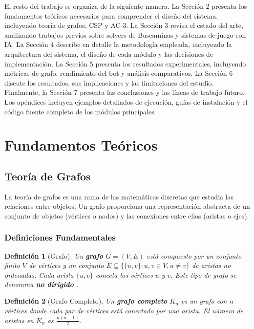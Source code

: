 \documentclass[12pt,a4paper]{article}
\newtheorem{definition}{Definición}[section]
\begin{document}
El resto del trabajo se organiza de la siguiente manera. La Sección 2 presenta los fundamentos teóricos necesarios para comprender el diseño del sistema, incluyendo teoría de grafos, CSP y AC-3. La Sección 3 revisa el estado del arte, analizando trabajos previos sobre solvers de Buscaminas y sistemas de juego con IA. La Sección 4 describe en detalle la metodología empleada, incluyendo la arquitectura del sistema, el diseño de cada módulo y las decisiones de implementación. La Sección 5 presenta los resultados experimentales, incluyendo métricas de grafo, rendimiento del bot y análisis comparativos. La Sección 6 discute los resultados, sus implicaciones y las limitaciones del estudio. Finalmente, la Sección 7 presenta las conclusiones y las líneas de trabajo futuro. Los apéndices incluyen ejemplos detallados de ejecución, guías de instalación y el código fuente completo de los módulos principales.

\section{Fundamentos Teóricos}

\subsection{Teoría de Grafos}

La teoría de grafos es una rama de las matemáticas discretas que estudia las relaciones entre objetos. Un grafo proporciona una representación abstracta de un conjunto de objetos (vértices o nodos) y las conexiones entre ellos (aristas o ejes).

\subsubsection{Definiciones Fundamentales}

\begin{definition}[Grafo]
Un \textbf{grafo} $G = (V, E)$ está compuesto por un conjunto finito $V$ de vértices y un conjunto $E \subseteq \{\{u, v\} : u, v \in V, u \neq v\}$ de aristas no ordenadas. Cada arista $\{u, v\}$ conecta los vértices $u$ y $v$. Este tipo de grafo se denomina \textbf{no dirigido} \cite{west2001introduction}.
\end{definition}

\begin{definition}[Grafo Completo]
Un \textbf{grafo completo} $K_n$ es un grafo con $n$ vértices donde cada par de vértices está conectado por una arista. El número de aristas en $K_n$ es $\frac{n(n-1)}{2}$.
\end{definition}
\end{document}
